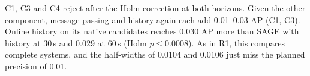 C1, C3 and C4 reject after the Holm correction at both horizons.
Given the other component, message passing and history again each add 0.01--0.03 AP (C1, C3).
Online history on its native candidates reaches 0.030 AP more than SAGE with history at 30\,s and 0.029 at 60\,s (Holm $p \leq 0.0008$).
As in R1, this compares complete systems, and the half-widths of 0.0104 and 0.0106 just miss the planned precision of 0.01.



